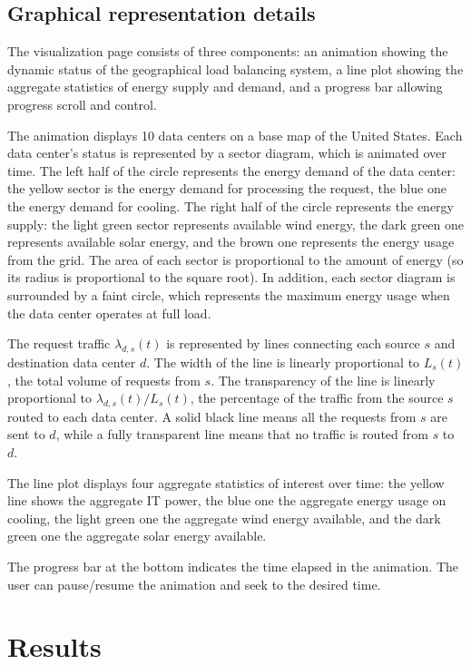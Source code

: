 \documentclass{acm_proc_article-sp}
\begin{document}
\subsection{Graphical representation details}
The visualization page consists of three components: an animation showing the dynamic status of the geographical load balancing system, a line plot showing the aggregate statistics of energy supply and demand, and a progress bar allowing progress scroll and control.

The animation displays 10 data centers on a base map of the United States. Each data center’s status is represented by a sector diagram, which is animated over time. The left half of the circle represents the energy demand of the data center: the yellow sector is the energy demand for processing the request, the blue one the energy demand for cooling. The right half of the circle represents the energy supply: the light green sector represents available wind energy, the dark green one represents available solar energy, and the brown one represents the energy usage from the grid. The area of each sector is proportional to the amount of energy (so its radius is proportional to the square root). In addition, each sector diagram is surrounded by a faint circle, which represents the maximum energy usage when the data center operates at full load.

The request traffic $\lambda_{d,s}(t)$ is represented by lines connecting each source $s$ and destination data center $d$. The width of the line is linearly proportional to $L_s(t)$, the total volume of requests from $s$. The transparency of the line is linearly proportional to ${\lambda_{d,s}(t)} / {L_s(t)}$, the percentage of the traffic from the source $s$ routed to each data center. A solid black line means all the requests from $s$ are sent to $d$, while a fully transparent line means that no traffic is routed from $s$ to $d$.

The line plot displays four aggregate statistics of interest over time: the yellow line shows the aggregate IT power, the blue one the aggregate energy usage on cooling, the light green one the aggregate wind energy available, and the dark green one the aggregate solar energy available.

The progress bar at the bottom indicates the time elapsed in the animation. The user can pause/resume the animation and seek to the desired time.


\section{Results}
\end{document}
